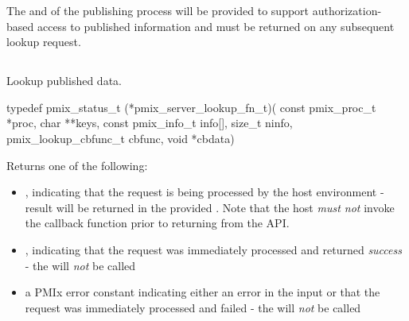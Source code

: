 The  and  of the publishing process will be provided to support authorization-based access to published information and must be returned on any subsequent lookup request.
\advicermend

\subsection{}

\summary

Lookup published data.

\format

\cspecificstart
\begin{codepar}
typedef pmix_status_t (*pmix_server_lookup_fn_t)(
                             const pmix_proc_t *proc,
                             char **keys,
                             const pmix_info_t info[],
                             size_t ninfo,
                             pmix_lookup_cbfunc_t cbfunc,
                             void *cbdata)
\end{codepar}
\cspecificend

\begin{arglist}
\end{arglist}

Returns one of the following:

\begin{itemize}
    \item {}, indicating that the request is being processed by the host environment - result will be returned in the provided . Note that the host \emph{must not} invoke the callback function prior to returning from the \ac{API}.
    \item {}, indicating that the request was immediately processed and returned \textit{success} - the  will \textit{not} be called
    \item a PMIx error constant indicating either an error in the input or that the request was immediately processed and failed - the  will \textit{not} be called
\end{itemize}

